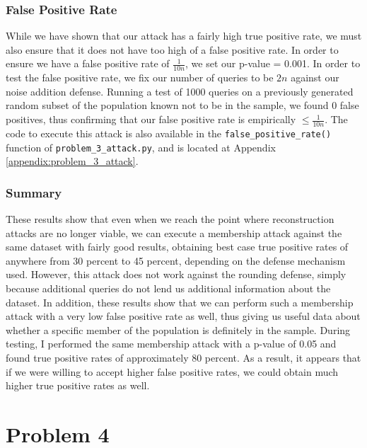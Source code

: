 \documentclass[12pt]{article}
\def\cl{\lstinline}
\begin{document}
\subsubsection{False Positive Rate}

\noindent

While we have shown that our attack has a fairly high true positive rate, we must also ensure that it does not have too high of a false positive rate. In order to ensure we have a false positive rate of $\frac{1}{10n}$, we set our p-value = 0.001. In order to test the false positive rate, we fix our number of queries to be $2n$ against our noise addition defense. Running a test of 1000 queries on a previously generated random subset of the population known not to be in the sample, we found 0 false positives, thus confirming that our false positive rate is empirically $\leq \frac{1}{10n}$. The code to execute this attack is also available in the \cl{false_positive_rate()} function of \cl{problem_3_attack.py}, and is located at Appendix \ref{appendix:problem_3_attack}.

\subsubsection{Summary}

\noindent

These results show that even when we reach the point where reconstruction attacks are no longer viable, we can execute a membership attack against the same dataset with fairly good results, obtaining best case true positive rates of anywhere from 30 percent to 45 percent, depending on the defense mechanism used. However, this attack does not work against the rounding defense, simply because additional queries do not lend us additional information about the dataset. In addition, these results show that we can perform such a membership attack with a very low false positive rate as well, thus giving us useful data about whether a specific member of the population is definitely in the sample. During testing, I performed the same membership attack with a p-value of 0.05 and found true positive rates of approximately 80 percent. As a result, it appears that if we were willing to accept higher false positive rates, we could obtain much higher true positive rates as well.

\newpage

\section{Problem 4}
\end{document}
